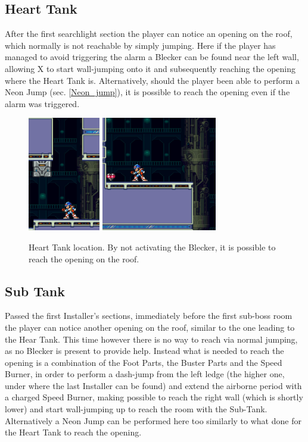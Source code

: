 \subsection{Heart Tank}
After the first searchlight section the player can notice an opening on the roof, which normally is not reachable by simply jumping. Here if the player has managed to avoid triggering the alarm a Blecker can be found near the left wall, allowing X to start wall-jumping onto it and subsequently reaching the opening where the Heart Tank is. Alternatively, should the player been able to perform a Neon Jump (sec. \ref{Neon_jump}), it is possible to reach the opening even if the alarm was triggered.

\begin{figure}[htp]
	\centering
	\includegraphics[height=5cm]{figures/X2/Magna_centipede/Centipede_heart_1.png}
	\includegraphics[height=5cm]{figures/X2/Magna_centipede/Centipede_heart_2.png}
	\caption{Heart Tank location. By not activating the Blecker, it is possible to reach the opening on the roof.}
\end{figure}

\subsection{Sub Tank}
Passed the first Installer's sections, immediately before the first sub-boss room the player can notice another opening on the roof, similar to the one leading to the Hear Tank. This time however there is no way to reach via normal jumping, as no Blecker is present to provide help. Instead what is needed to reach the opening is a combination of the Foot Parts, the Buster Parts and the Speed Burner, in order to perform a dash-jump from the left ledge (the higher one, under where the last Installer can be found) and extend the airborne period with a charged Speed Burner, making possible to reach the right wall (which is shortly lower) and start wall-jumping up to reach the room with the Sub-Tank. Alternatively a Neon Jump can be performed here too similarly to what done for the Heart Tank to reach the opening.

